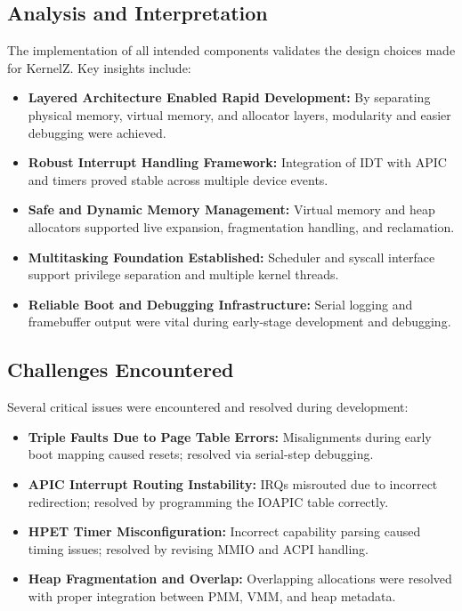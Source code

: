 \documentclass[12pt]{extarticle}
\begin{document}
\subsection{Analysis and Interpretation}

The implementation of all intended components validates the design choices made for KernelZ. Key insights include:

\begin{itemize}
    \item \textbf{Layered Architecture Enabled Rapid Development:} By separating physical memory, virtual memory, and allocator layers, modularity and easier debugging were achieved.
    \item \textbf{Robust Interrupt Handling Framework:} Integration of IDT with APIC and timers proved stable across multiple device events.
    \item \textbf{Safe and Dynamic Memory Management:} Virtual memory and heap allocators supported live expansion, fragmentation handling, and reclamation.
    \item \textbf{Multitasking Foundation Established:} Scheduler and syscall interface support privilege separation and multiple kernel threads.
    \item \textbf{Reliable Boot and Debugging Infrastructure:} Serial logging and framebuffer output were vital during early-stage development and debugging.
\end{itemize}

\subsection{Challenges Encountered}

Several critical issues were encountered and resolved during development:

\begin{itemize}
    \item \textbf{Triple Faults Due to Page Table Errors:} Misalignments during early boot mapping caused resets; resolved via serial-step debugging.
    \item \textbf{APIC Interrupt Routing Instability:} IRQs misrouted due to incorrect redirection; resolved by programming the IOAPIC table correctly.
    \item \textbf{HPET Timer Misconfiguration:} Incorrect capability parsing caused timing issues; resolved by revising MMIO and ACPI handling.
    \item \textbf{Heap Fragmentation and Overlap:} Overlapping allocations were resolved with proper integration between PMM, VMM, and heap metadata.
\end{itemize}
\end{document}
